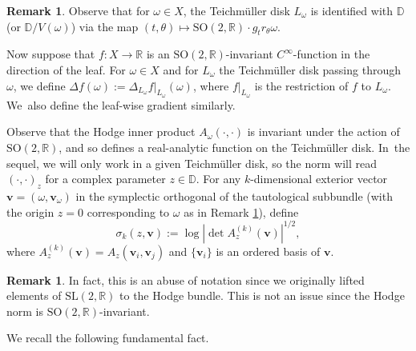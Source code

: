 \documentclass[10pt]{amsart}
\theoremstyle{plain}
\theoremstyle{definition}
\newtheorem{rem}[thm]{Remark}
\numberwithin{equation}{subsection}
\newcommand\bD{\mathbb{D}}
\newcommand\bR{\mathbb{R}}\let\R\bR
\newcommand{\SL}{\mathrm{SL}}
\newcommand{\SO}{\mathrm{SO}}
\let\laplacian\Delta
\newcommand{\bfv}{\boldsymbol{v}}
\newcommand{\defeq}{:=}
\newcommand{\Tm}{Teichmüller\xspace}
\begin{document}
\begin{rem}\label{embedding}
Observe that for $\omega \in X$, the \Tm disk $L_\omega$ is identified with $\bD$ (or $\bD/V(\omega)$) via the map $(t,\theta) \mapsto \SO(2,\bR) \cdot g_{t} r_{\theta} \omega$.
\end{rem}

Now suppose that $f: X\to\R$ is an $\SO(2,\bR)$-invariant $C^\infty$-function in the direction of the leaf. For $\omega \in X$ and for $L_\omega$ the \Tm disk passing through $\omega$, we define $\laplacian f(\omega) \defeq \laplacian_{L_\omega} f|_{L_\omega}(\omega)$, where $f|_{L_\omega}$ is the restriction of $f$ to $L_\omega$. We~also define the leaf-wise gradient similarly.

Observe that the Hodge inner product $A_{\omega}(\cdot,\cdot)$ is invariant under the action of $\SO(2,\bR)$, and so defines a real-analytic function on the \Tm disk. In~the sequel, we will only work in a given \Tm disk, so the norm will read $(\cdot,\cdot)_z$ for a complex parameter $z \in \bD$. For any $k$-dimensional exterior vector $\bfv=(\omega,\bfv_{\omega})$ in the symplectic orthogonal of the tautological subbundle (with the origin $z=0$ corresponding to $\omega$ as in Remark \ref{embedding}), define\vspace*{-3pt}
\[
\sigma_k(z,\bfv) := \log |{\det A^{(k)}_{z} (\bfv)}|^{1/2},
\]
where $A^{(k)}_{z}(\bfv) = A_z(\bfv_i,\bfv_j)$ and $\{\bfv_i\}$ is an ordered basis of $\bfv$.
\begin{rem}In fact, this is an abuse of notation since we originally lifted elements of $\SL(2,\bR)$ to the Hodge bundle. This is not an issue since the Hodge norm is $\SO(2,\bR)$-invariant.
\end{rem}

We recall the following fundamental fact.
\end{document}
